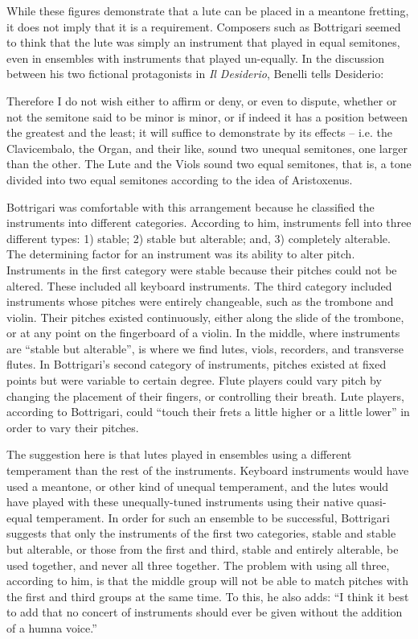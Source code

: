 While these figures demonstrate that a lute can be placed in a meantone fretting,
it does not imply that it is a requirement.  Composers such as Bottrigari seemed 
to think that the lute was simply an instrument that played in
equal semitones, even in ensembles with instruments that played un-equally.
In the discussion between his two fictional protagonists in \textit{Il Desiderio}, 
Benelli tells Desiderio:

\begin{blocks}
Therefore I do not wish either to affirm or deny, or even to dispute, whether or not 
the semitone said to be minor is minor, or if indeed it has a position between the 
greatest and the least; it will suffice to demonstrate by its effects -- i.e. the
Clavicembalo, the Organ, and their like, sound two unequal semitones, one larger 
than the other. The Lute and the Viols sound two equal semitones, that is, a tone
divided into two equal semitones according to the idea of Aristoxenus. \autocite[17]{HB:1}
\end{blocks}

Bottrigari was comfortable with this arrangement because he classified the
instruments into different categories.  According to him, instruments fell into
three different types: 1) stable; 2) stable but alterable; and, 3) completely
alterable.  The determining factor for an instrument was its ability to alter
pitch.  Instruments in the first category were stable because their pitches
could not be altered.  These included all keyboard instruments.  The third
category included instruments whose pitches were entirely changeable, such as
the trombone and violin.  Their pitches existed continuously, either along the
slide of the trombone, or at any point on the fingerboard of a violin. In the
middle, where instruments are ``stable but alterable'', is where we find lutes,
viols, recorders, and transverse flutes. In Bottrigari's second category of
instruments,  pitches existed at fixed points but were variable to certain
degree.  Flute players could vary pitch by changing the placement of their
fingers, or controlling their breath.  Lute players, according to Bottrigari,
could ``touch their frets a little higher or a little lower'' in order to
vary their pitches. \autocite[15]{HB:1}

The suggestion here is that lutes played in ensembles using  a different
temperament than the rest of the instruments.  Keyboard instruments would have
used a meantone, or other kind of unequal temperament, and the lutes would have
played with these unequally-tuned instruments using their native quasi-equal
temperament.  In order for such an ensemble to be successful, Bottrigari
suggests that only the instruments of the first two categories, stable and
stable but alterable, or those from the first and third, stable and entirely
alterable, be used together, and never all three together.  The problem with
using all three, according to him, is that the middle group will not be able to
match pitches with the first and third groups at the same time. To this, he also
adds: ``I think it best to add that no concert of instruments should ever be
given without the addition of a humna voice.''  \autocite[23]{HB:1}

